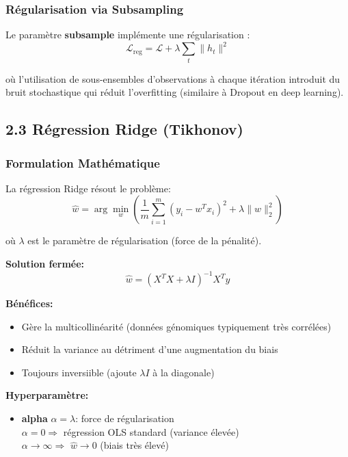 \documentclass[12pt,a4paper,french]{article}
\begin{document}
\subsubsection{Régularisation via Subsampling}

Le paramètre \textbf{subsample} implémente une régularisation :
\begin{equation}
\mathcal{L}_{\text{reg}} = \mathcal{L} + \lambda \sum_t \|h_t\|^2
\end{equation}

où l'utilisation de sous-ensembles d'observations à chaque itération introduit du bruit stochastique qui réduit l'overfitting (similaire à Dropout en deep learning).

\subsection{2.3 Régression Ridge (Tikhonov)}

\subsubsection{Formulation Mathématique}

La régression Ridge résout le problème:
\begin{equation}
\hat{w} = \arg\min_w \left( \frac{1}{m} \sum_{i=1}^m (y_i - w^T x_i)^2 + \lambda \|w\|_2^2 \right)
\end{equation}

où $\lambda$ est le paramètre de régularisation (force de la pénalité).

\textbf{Solution fermée:}
\begin{equation}
\hat{w} = (X^T X + \lambda I)^{-1} X^T y
\end{equation}

\textbf{Bénéfices:}
\begin{itemize}
    \item Gère la multicollinéarité (données génomiques typiquement très corrélées)
    \item Réduit la variance au détriment d'une augmentation du biais
    \item Toujours inversiible (ajoute $\lambda I$ à la diagonale)
\end{itemize}

\textbf{Hyperparamètre:}
\begin{itemize}
    \item \textbf{alpha} $\alpha = \lambda$: force de régularisation
        \\ $\alpha = 0 \Rightarrow$ régression OLS standard (variance élevée)
        \\ $\alpha \to \infty \Rightarrow$ $\hat{w} \to 0$ (biais très élevé)
\end{itemize}
\end{document}
